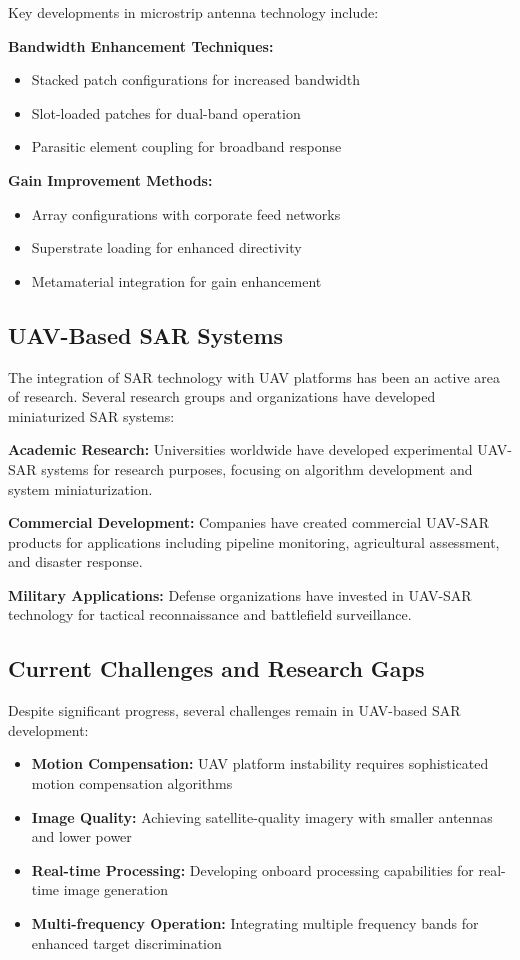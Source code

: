 \documentclass[12pt]{article}
\begin{document}
Key developments in microstrip antenna technology include:

\textbf{Bandwidth Enhancement Techniques:}
\begin{itemize}
    \item Stacked patch configurations for increased bandwidth
    \item Slot-loaded patches for dual-band operation
    \item Parasitic element coupling for broadband response
\end{itemize}

\textbf{Gain Improvement Methods:}
\begin{itemize}
    \item Array configurations with corporate feed networks
    \item Superstrate loading for enhanced directivity
    \item Metamaterial integration for gain enhancement
\end{itemize}

\subsection{UAV-Based SAR Systems}

The integration of SAR technology with UAV platforms has been an active area of research. Several research groups and organizations have developed miniaturized SAR systems:

\textbf{Academic Research:} Universities worldwide have developed experimental UAV-SAR systems for research purposes, focusing on algorithm development and system miniaturization.

\textbf{Commercial Development:} Companies have created commercial UAV-SAR products for applications including pipeline monitoring, agricultural assessment, and disaster response.

\textbf{Military Applications:} Defense organizations have invested in UAV-SAR technology for tactical reconnaissance and battlefield surveillance.

\subsection{Current Challenges and Research Gaps}

Despite significant progress, several challenges remain in UAV-based SAR development:

\begin{itemize}
    \item \textbf{Motion Compensation:} UAV platform instability requires sophisticated motion compensation algorithms
    \item \textbf{Image Quality:} Achieving satellite-quality imagery with smaller antennas and lower power
    \item \textbf{Real-time Processing:} Developing onboard processing capabilities for real-time image generation
    \item \textbf{Multi-frequency Operation:} Integrating multiple frequency bands for enhanced target discrimination
\end{itemize}
\end{document}
